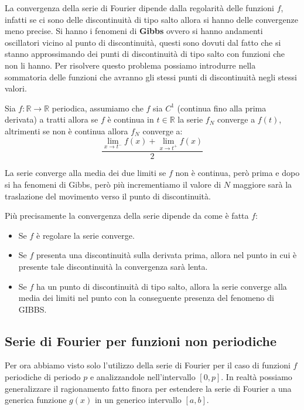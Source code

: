La convergenza della serie di Fourier dipende dalla regolarità delle funzioni $f$,
infatti se ci sono delle discontinuità di tipo salto allora si hanno delle
convergenze meno precise. Si hanno i fenomeni di \textbf{Gibbs} ovvero si hanno andamenti
oscillatori vicino al punto di discontinuità, questi sono dovuti dal fatto che si
stanno approssimando dei punti di discontinuità di tipo salto con funzioni che non
li hanno.
Per risolvere questo problema possiamo introdurre nella sommatoria delle funzioni
che avranno gli stessi punti di discontinuità negli stessi valori.

\begin{teorema}
    Sia $f:\mathbb{R}\to \mathbb{R}$ periodica, assumiamo che $f$ sia $C^1$ (continua
    fino alla prima derivata) a tratti allora se $f$ è continua in $t \in \mathbb{R}$
    la serie $f_N$ converge a $f(t)$, altrimenti se non è continua allora $f_N$
    converge a:
    \begin{equation*}
        \frac{\lim_{x\to t^-}f(x) +\lim_{x\to t^+}f(x)}{2}
    \end{equation*}
\end{teorema}
La serie converge alla media dei due limiti se $f$ non è continua, però prima e
dopo si ha fenomeni di Gibbs, però più incrementiamo il valore di $N$ maggiore
sarà la traslazione del movimento verso il punto di discontinuità.

Più precisamente la convergenza della serie dipende da come è fatta $f$:
\begin{itemize}
    \item Se $f$ è regolare la serie converge.
    \item Se $f$ presenta una discontinuità sulla derivata prima, allora nel
          punto in cui è presente tale discontinuità la convergenza sarà lenta.
    \item Se $f$ ha un punto di discontinuità di tipo salto, allora la serie
          converge alla media dei limiti nel punto con la conseguente presenza
          del fenomeno di GIBBS.
\end{itemize}
\subsection{Serie di Fourier per funzioni non periodiche}
Per ora abbiamo visto solo l'utilizzo della serie di Fourier per il caso di funzioni
$f$ periodiche di periodo $p$ e analizzandole nell'intervallo $[0,p]$. In realtà
possiamo generalizzare il ragionamento fatto finora per estendere la serie di Fourier
a una generica funzione $g(x)$ in un generico intervallo $[a,b]$.

